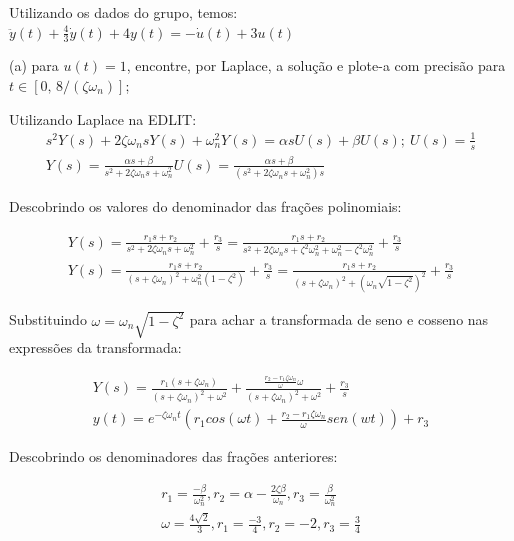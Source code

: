 \documentclass[10pt]{article}
\begin{document}
Utilizando os dados do grupo, temos: $\ddot{y}(t) + \frac{4}{3} \dot{y}(t) + 4 y(t) = -\dot{u}(t) + 3u(t)$

(a) para $u(t) = 1$, encontre, por Laplace, a solução e plote-a com precisão para $t \in [0,\, 8/(\zeta \omega_n)]$;

\vspace{\baselineskip}

Utilizando Laplace na EDLIT:
\begin{align*}
    s^2Y(s) + 2\zeta \omega_n sY(s) + \omega_n^2 Y(s) = \alpha sU(s) + \beta U(s); \ U(s) = \frac{1}{s} \\
    Y(s) = \frac{\alpha s + \beta}{s^2 + 2\zeta \omega_n s + \omega_n^2} U(s) = \frac{\alpha s + \beta}{(s^2 + 2\zeta \omega_n s + \omega_n^2)s}
\end{align*}

Descobrindo os valores do denominador das frações polinomiais:

\begin{align*}
    Y(s) = \frac{r_1 s + r_2}{s^2 + 2\zeta \omega_n s + \omega_n^2} + \frac{r_3}{s} = \frac{r_1 s + r_2}{s^2 + 2\zeta \omega_n s + \zeta^2 \omega_n^2 + \omega_n^2 - \zeta^2 \omega_n^2} + \frac{r_3}{s} \\
    Y(s) = \frac{r_1 s + r_2}{(s + \zeta \omega_n)^2 + \omega_n^2 (1 - \zeta^2)} + \frac{r_3}{s} = \frac{r_1 s + r_2}{(s + \zeta \omega_n)^2 + (\omega_n \sqrt{1 - \zeta^2})^2} + \frac{r_3}{s}
\end{align*}

Substituindo $\omega = \omega_n \sqrt{1 - \zeta^2}$ para achar a transformada de seno e cosseno nas expressões da transformada:

\begin{align*}
    Y(s) = \frac{r_1(s + \zeta \omega_n)}{(s + \zeta \omega_n)^2 + \omega^2} + \frac{\frac{r_2 - r_1 \zeta \omega_n}{\omega} \omega}{(s + \zeta \omega_n)^2 + \omega^2} + \frac{r_3}{s} \\
    y(t) = e^{- \zeta \omega_n t}(r_1 cos(\omega t) + \frac{r_2 - r_1 \zeta \omega_n}{\omega}sen(wt)) + r_3
\end{align*}

Descobrindo os denominadores das frações anteriores:

\begin{align*}
    r_1 = \frac{-\beta}{\omega_n^2}, r_2 = \alpha - \frac{2 \zeta \beta}{\omega_n}, r_3 = \frac{\beta}{\omega_n^2} \\
    \omega = \frac{4 \sqrt{2}}{3}, r_1 = \frac{-3}{4}, r_2 = -2, r_3 = \frac{3}{4}
\end{align*}
\end{document}
